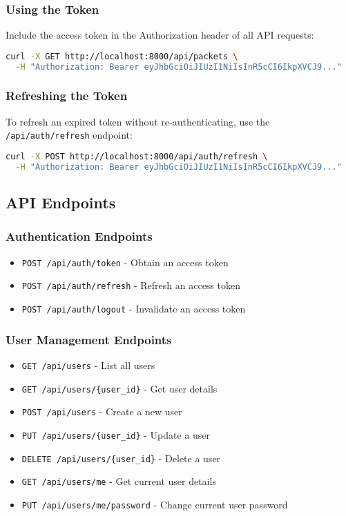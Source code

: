 \subsubsection{Using the Token}
Include the access token in the Authorization header of all API requests:

\begin{lstlisting}[language=bash, caption=Using the Access Token]
curl -X GET http://localhost:8000/api/packets \
  -H "Authorization: Bearer eyJhbGciOiJIUzI1NiIsInR5cCI6IkpXVCJ9..."
\end{lstlisting}

\subsubsection{Refreshing the Token}
To refresh an expired token without re-authenticating, use the \texttt{/api/auth/refresh} endpoint:

\begin{lstlisting}[language=bash, caption=Refreshing the Access Token]
curl -X POST http://localhost:8000/api/auth/refresh \
  -H "Authorization: Bearer eyJhbGciOiJIUzI1NiIsInR5cCI6IkpXVCJ9..."
\end{lstlisting}

\subsection{API Endpoints}

\subsubsection{Authentication Endpoints}
\begin{itemize}
    \item \texttt{POST /api/auth/token} - Obtain an access token
    \item \texttt{POST /api/auth/refresh} - Refresh an access token
    \item \texttt{POST /api/auth/logout} - Invalidate an access token
\end{itemize}

\subsubsection{User Management Endpoints}
\begin{itemize}
    \item \texttt{GET /api/users} - List all users
    \item \texttt{GET /api/users/\{user\_id\}} - Get user details
    \item \texttt{POST /api/users} - Create a new user
    \item \texttt{PUT /api/users/\{user\_id\}} - Update a user
    \item \texttt{DELETE /api/users/\{user\_id\}} - Delete a user
    \item \texttt{GET /api/users/me} - Get current user details
    \item \texttt{PUT /api/users/me/password} - Change current user password
\end{itemize}

